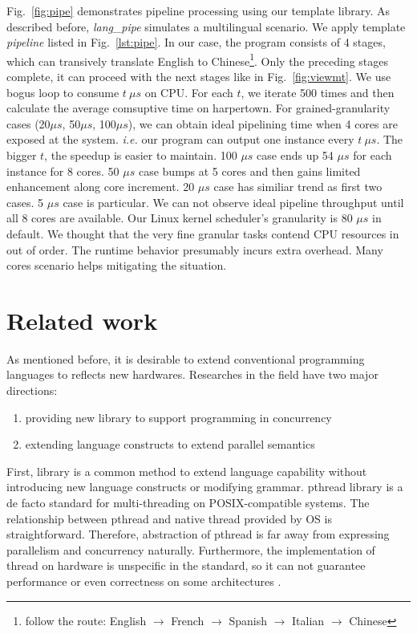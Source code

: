 \documentclass[10pt, conference, compsocconf]{IEEEtran}
\begin{document}
Fig.~\ref{fig:pipe} demonstrates pipeline processing using our
template library. As described before, \textit{lang\_pipe} simulates a
multilingual scenario. We apply template \emph{pipeline} listed in
Fig.~\ref{lst:pipe}. In our case, the program consists of  4 stages,
which can transively translate English to Chinese\footnote{follow the 
  route: English  $\to$ French $\to$ Spanish $\to$ Italian $\to$
  Chinese}. Only the preceding stages complete,  it can proceed with
the next stages like in Fig.~\ref{fig:viewmt}. We use bogus loop to consume $t \  \mu s$ on CPU. For each $t$, we iterate 500
times and then calculate the average comsuptive time on harpertown. For
grained-granularity cases (20$\mu s$, 50$\mu s$, 100$\mu s$), we can obtain ideal
pipelining time when 4 cores are exposed at the system.
\textit{i.e.} our program can output one instance every $t\  \mu
s$. The bigger $t$, the speedup is easier to maintain. 100 $\mu s$ case ends up 54 $\mu s$ for each instance for 8 cores. 50  $\mu s$ case
bumps at 5 cores and then gains limited enhancement along core increment. 20
$\mu s$ case has similiar trend as first two cases. 5 $\mu s$ case is
particular. We can not observe ideal pipeline throughput until all 8
cores are available.  Our Linux kernel scheduler's granularity is 80
$\mu s$ in default. We thought that the very fine granular tasks contend CPU resources in out of order. The runtime behavior presumably
incurs extra overhead. Many cores scenario helps mitigating the situation.

\section{Related work}
As mentioned before, it is desirable to extend conventional programming languages to reflects new hardwares. Researches in the field have two major directions:
\begin{enumerate}
\item providing new library to support programming in concurrency
\item extending language constructs to extend parallel semantics
\end{enumerate}

First, library is a common method to extend language capability
without introducing new language constructs or modifying
grammar. pthread library is a de facto standard for
multi-threading on POSIX-compatible systems. The relationship between pthread and native thread provided by OS is straightforward. Therefore, abstraction of pthread is far away from expressing parallelism and concurrency naturally. Furthermore, the implementation of thread on hardware is unspecific in the standard, so it can not guarantee performance or even correctness on some architectures \cite{Boehm05}.
\end{document}
